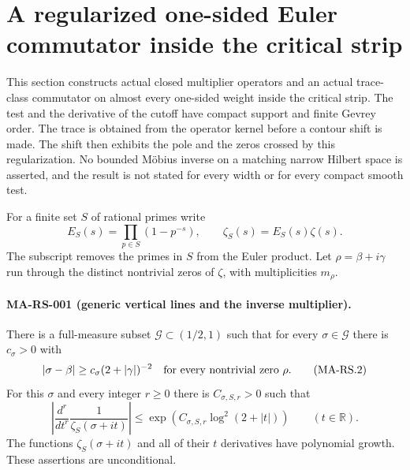 \section{A regularized one-sided Euler commutator inside the critical strip}
\label{sec:regularized-strip}

This section constructs actual closed multiplier operators and an
actual trace-class commutator on almost every one-sided weight inside
the critical strip.  The test and the derivative of the cutoff have
compact support and finite Gevrey order.  The trace is obtained from
the operator kernel before a contour shift is made.  The shift then
exhibits the pole and the zeros crossed by this regularization.
No bounded M\"obius inverse on a matching narrow Hilbert space is
asserted, and the result is not stated for every width or for every
compact smooth test.

For a finite set $S$ of rational primes write
\[
 E_S(s)=\prod_{p\in S}(1-p^{-s}),\qquad
 \zeta_S(s)=E_S(s)\zeta(s).
 \tag{MA-RS.1}
\]
The subscript removes the primes in $S$ from the Euler product.
Let $\rho=\beta+i\gamma$ run through the distinct nontrivial
zeros of $\zeta$, with multiplicities $m_\rho$.

\paragraph{MA-RS-001 (generic vertical lines and the inverse multiplier).}
There is a full-measure subset
$\mathscr G\subset(1/2,1)$ such that for every
$\sigma\in\mathscr G$ there is $c_\sigma>0$ with
\[
       |\sigma-\beta|
          \ge c_\sigma(2+|\gamma|)^{-2}
                    \quad\hbox{for every nontrivial zero }\rho.
 \tag{MA-RS.2}
\]
For this $\sigma$ and every integer $r\ge0$ there is
$C_{\sigma,S,r}>0$ such that
\[
 \left|\frac{d^r}{dt^r}\frac1{\zeta_S(\sigma+it)}\right|
       \le \exp\!\left(C_{\sigma,S,r}
                            \log^2(2+|t|)\right)
                    \qquad(t\in\mathbb R).
 \tag{MA-RS.3}
\]
The functions $\zeta_S(\sigma+it)$ and all of their
$t$ derivatives have polynomial growth.  These assertions
are unconditional.

